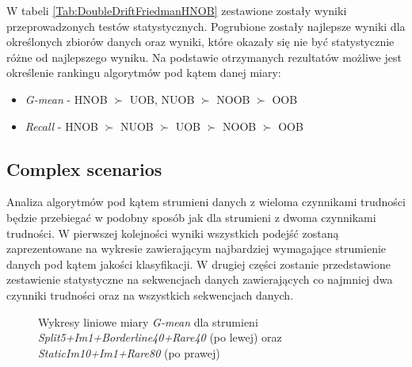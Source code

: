 \noindent W tabeli \ref{Tab:DoubleDriftFriedmanHNOB} zestawione zostały wyniki przeprowadzonych testów statystycznych. Pogrubione zostały najlepsze wyniki dla określonych zbiorów danych oraz wyniki, które okazały się nie być statystycznie różne od najlepszego wyniku. Na podstawie otrzymanych rezultatów możliwe jest określenie rankingu algorytmów pod kątem danej miary:

\begin{itemize}
    \item \textit{G-mean} - HNOB $\succ$ UOB, NUOB $\succ$ NOOB $\succ$ OOB
    \item \textit{Recall} - HNOB $\succ$ NUOB $\succ$ UOB $\succ$ NOOB $\succ$ OOB
\end{itemize}

\subsection{Complex scenarios}

\noindent Analiza algorytmów pod kątem strumieni danych z wieloma czynnikami trudności będzie przebiegać w podobny sposób jak dla strumieni z dwoma czynnikami trudności. W pierwszej kolejności wyniki wszystkich podejść zostaną zaprezentowane na wykresie zawierającym najbardziej wymagające strumienie danych pod kątem jakości klasyfikacji. W drugiej części zostanie przedstawione zestawienie statystyczne na sekwencjach danych zawierających co najmniej dwa czynniki trudności oraz na wszystkich sekwencjach danych.

\newpage

\begin{figure}[h]
    \centering
    \qquad
    \caption{Wykresy liniowe miary \textit{G-mean} dla strumieni \textit{Split5+Im1+Borderline40+Rare40} (po lewej) oraz \textit{StaticIm10+Im1+Rare80} (po prawej)}
\end{figure}

